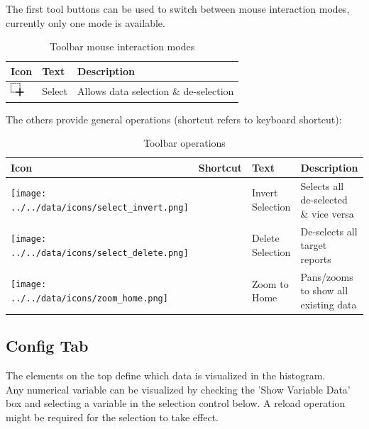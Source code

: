 The first tool buttons can be used to switch between mouse interaction modes, currently only one mode is available.

\begin{table}[H]
  \center
  \begin{tabular}{ | l | l | l |}
    \hline
    \textbf{Icon} & \textbf{Text} &  \textbf{Description} \\ \hline
    \includegraphics[width=0.5cm,frame]{../../data/icons/select_action.png} & Select & Allows data selection \& de-selection \\ \hline
  \end{tabular}
  \caption{Toolbar mouse interaction modes}
\end{table}

The others provide general operations (shortcut refers to keyboard shortcut):

\begin{table}[H]
  \center
  \begin{tabular}{ | l | l | l | l |}
    \hline
    \textbf{Icon} & \textbf{Shortcut} &\textbf{Text} &  \textbf{Description} \\ \hline
    \texttt{[image: ../../data/icons/select\_invert.png]} & & Invert Selection & Selects all de-selected \& vice versa \\ \hline
    \texttt{[image: ../../data/icons/select\_delete.png]} & & Delete Selection & De-selects all target reports \\ \hline
    \texttt{[image: ../../data/icons/zoom\_home.png]} & & Zoom to Home & Pans/zooms to show all existing data \\ \hline
  \end{tabular}
  \caption{Toolbar operations}
\end{table} 

\subsection{Config Tab}

The elements on the top define which data is visualized in the histogram. \\

Any numerical variable can be visualized by checking the 'Show Variable Data' box and selecting a variable in the selection control below.
A reload operation might be required for the selection to take effect. \\

